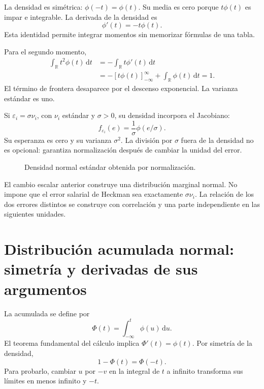 \documentclass[11pt,a4paper]{article}
\newcommand{\dd}{\,\mathrm d}
\begin{document}
La densidad es simétrica:
\(\phi(-t)=\phi(t)\).
Su media es cero porque \(t\phi(t)\)
es impar e integrable.
La derivada de la densidad es
\[
\phi'(t)=-t\phi(t).
\]
Esta identidad permite integrar momentos
sin memorizar fórmulas de una tabla.

Para el segundo momento,
\[
\begin{aligned}
\int_{\mathbb R}t^2\phi(t)\dd t
&=-\int_{\mathbb R}t\phi'(t)\dd t\\
&=-[t\phi(t)]_{-\infty}^{\infty}
+\int_{\mathbb R}\phi(t)\dd t=1.
\end{aligned}
\]
El término de frontera desaparece
por el descenso exponencial.
La varianza estándar es uno.

Si \(\varepsilon_i=\sigma\nu_i\),
con \(\nu_i\) estándar y \(\sigma>0\),
su densidad incorpora el Jacobiano:
\[
f_{\varepsilon_i}(e)
=\frac1\sigma\phi(e/\sigma).
\]
Su esperanza es cero y su varianza \(\sigma^2\).
La división por \(\sigma\) fuera de
la densidad no es opcional:
garantiza normalización después de
cambiar la unidad del error.

\begin{figure}[H]\centering
{}
\caption{Densidad normal estándar obtenida por normalización.}
\end{figure}


El cambio escalar anterior construye una distribución marginal normal. No impone que el error salarial de Heckman sea exactamente $\sigma\nu_i$. La relación de los dos errores distintos se construye con correlación y una parte independiente en las siguientes unidades.

\clearpage
\section{Distribución acumulada normal: simetría y derivadas de sus argumentos}

La acumulada se define por
\[
\Phi(t)=\int_{-\infty}^t\phi(u)\dd u.
\]
El teorema fundamental del cálculo implica
\(\Phi'(t)=\phi(t)\).
Por simetría de la densidad,
\[
1-\Phi(t)=\Phi(-t).
\]
Para probarlo, cambiar \(u\) por \(-v\)
en la integral de \(t\) a infinito
transforma sus límites en menos infinito y \(-t\).
\end{document}
